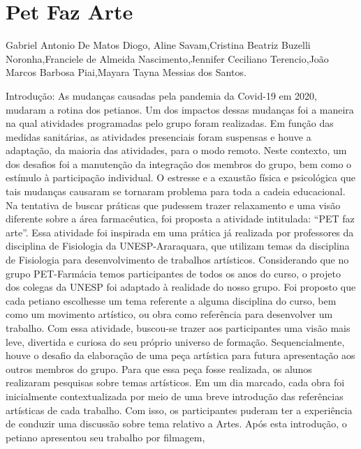 


\section*{Pet Faz Arte}

Gabriel Antonio De Matos Diogo, Aline Savam,Cristina Beatriz Buzelli Noronha,Franciele de Almeida Nascimento,Jennifer Ceciliano Terencio,João Marcos Barbosa Piai,Mayara Tayna Messias dos Santos.

Introdução: As mudanças causadas pela pandemia da Covid-19 em 2020, mudaram a rotina dos
petianos. Um dos impactos dessas mudanças foi a maneira na qual atividades programadas pelo 
grupo foram realizadas. Em função das medidas sanitárias, as atividades presenciais foram 
suspensas e houve a adaptação, da maioria das atividades, para o modo remoto. Neste contexto, 
um dos desafios foi a manutenção da integração dos membros do grupo, bem como o estímulo à 
participação individual. O estresse e a exaustão física e psicológica que tais mudanças causaram 
se tornaram problema para toda a cadeia educacional. Na tentativa de buscar práticas que pudessem 
trazer relaxamento e uma visão diferente sobre a área farmacêutica, foi proposta a atividade 
intitulada: “PET faz arte”. Essa atividade foi inspirada em uma prática já realizada por professores 
da disciplina de Fisiologia da UNESP-Araraquara, que utilizam temas da disciplina de Fisiologia 
para desenvolvimento de trabalhos artísticos. Considerando que no grupo PET-Farmácia temos 
participantes de todos os anos do curso, o projeto dos colegas da UNESP foi adaptado à realidade 
do nosso grupo. Foi proposto que cada petiano escolhesse um tema referente a alguma disciplina 
do curso, bem como um movimento artístico, ou obra como referência para desenvolver um 
trabalho. Com essa atividade, buscou-se trazer aos participantes uma visão mais leve, divertida e 
curiosa do seu próprio universo de formação. Sequencialmente, houve o desafio da elaboração de 
uma peça artística para futura apresentação aos outros membros do grupo. Para que essa peça fosse 
realizada, os alunos realizaram pesquisas sobre temas artísticos. Em um dia marcado, cada obra 
foi inicialmente contextualizada por meio de uma breve introdução das referências artísticas de 
cada trabalho. Com isso, os participantes puderam ter a experiência de conduzir uma discussão 
sobre tema relativo a Artes. Após esta introdução, o petiano apresentou seu trabalho por filmagem, 
